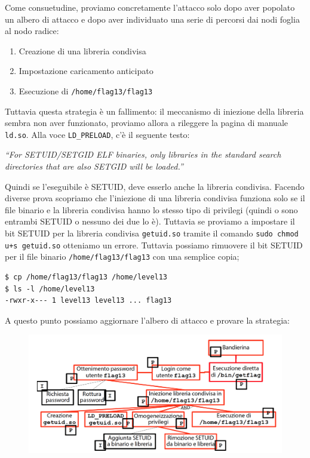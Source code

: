 Come consuetudine, proviamo concretamente l'attacco solo dopo aver popolato un albero di attacco e dopo aver individuato una serie di percorsi dai nodi foglia al nodo radice:
\begin{enumerate}
    \item Creazione di una libreria condivisa
    \item Impostazione caricamento anticipato
    \item Esecuzione di \texttt{/home/flag13/flag13}
\end{enumerate}
Tuttavia questa strategia è un fallimento: il meccanismo di iniezione della libreria sembra non aver funzionato, proviamo allora a rileggere la pagina di manuale \texttt{ld.so}. Alla voce \texttt{LD\_PRELOAD}, c'è il seguente testo:
\begin{center}
    \textit{“For SETUID/SETGID ELF binaries,
only libraries in the standard search directories
that are also SETGID will be loaded.”}
\end{center}
Quindi se l'eseguibile è SETUID, deve esserlo anche la libreria condivisa. Facendo diverse prova scopriamo che l'iniezione di una libreria condivisa funziona solo se il file binario e la libreria condivisa hanno lo stesso tipo di privilegi (quindi o sono entrambi SETUID o nessuno dei due lo è). Tuttavia se proviamo a impostare il bit SETUID per la libreria condivisa \texttt{getuid.so} tramite il comando \texttt{sudo chmod u+s getuid.so} otteniamo un errore. Tuttavia possiamo rimuovere il bit SETUID per il file binario \texttt{/home/flag13/flag13} con una semplice copia;

\begin{mdframed}[backgroundcolor=white!20,shadow=false]
\begin{lstlisting}
$ cp /home/flag13/flag13 /home/level13
$ ls -l /home/level13
-rwxr-x--- 1 level13 level13 ... flag13
\end{lstlisting}
\end{mdframed}

A questo punto possiamo aggiornare l'albero di attacco e provare la strategia:

\begin{figure}[hbpt!]
    \centering
    \includegraphics[width=0.8 \textwidth]{./Images/cap5/5.13.png}
\end{figure}
\FloatBarrier

